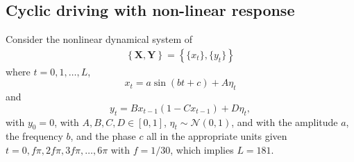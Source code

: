 \subsection{Cyclic driving with non-linear response}
\label{sec:nonli}
Consider the nonlinear dynamical system of
\begin{eqnarray}
\label{eqn:nonlinearEX}
\left\{\mathbf{X},\mathbf{Y}\right\} = \left\{\{x_t\},\{y_t\}\right\}
\end{eqnarray}
where $t=0,1,\ldots,L$,
\begin{equation*}
x_t = a\sin(bt+c)+A\eta_t
\end{equation*}
and
\begin{equation*}
y_t = Bx_{t-1}\left(1-Cx_{t-1}\right)+D\eta_t,
\end{equation*}
with $y_0 = 0$, with $A,B,C,D\in[0,1]$, $\eta_t\sim\mathcal{N}\left(0,1\right)$, and with the amplitude $a$, the frequency $b$, and the phase $c$ all in the appropriate units given $t=0,f\pi,2f\pi,3f\pi,\ldots,6\pi$ with $f=1/30$, which implies $L=181$.

